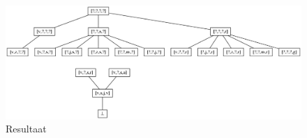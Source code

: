 \documentclass[alternative-exam.tex]{subfiles}
\begin{document}
\begin{figure}
\centering
\caption{Resultaat}
\label{resultaat}
\includegraphics[scale=0.5]{resources/graphs/resultaat.png}
\end{figure}
\end{document}
